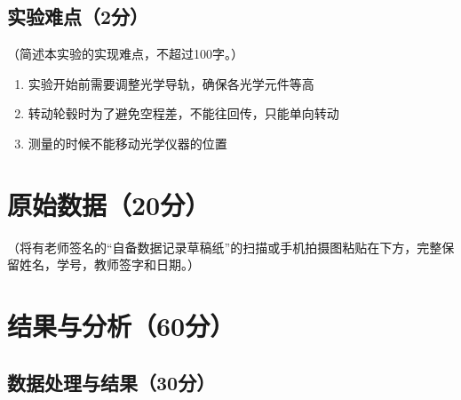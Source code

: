 \documentclass[]{../template/Report}%
\begin{document}
\subsection{实验难点（2分）}
（简述本实验的实现难点，不超过100字。）
\begin{enumerate}
    \item 实验开始前需要调整光学导轨，确保各光学元件等高
    \item 转动轮毂时为了避免空程差，不能往回传，只能单向转动
    \item 测量的时候不能移动光学仪器的位置
\end{enumerate}
\begin{fullreportonly}
\section{原始数据（20分）}
（将有老师签名的“自备数据记录草稿纸”的扫描或手机拍摄图粘贴在下方，完整保留姓名，学号，教师签字和日期。）

\section{结果与分析（60分）}
\subsection{数据处理与结果（30分）}

\end{fullreportonly}
\end{document}
